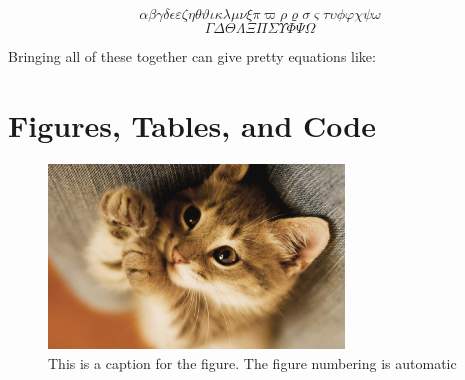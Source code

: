 \documentclass{article}
\begin{document}
\begin{equation}
    \alpha \beta \gamma \delta \epsilon \varepsilon \zeta \eta \theta \vartheta \iota \kappa \lambda \mu \nu \xi \pi \varpi \rho \varrho \sigma \varsigma \tau \upsilon \phi \varphi \chi \psi \omega
\end{equation}
\begin{equation}
    \Gamma \Delta \Theta \Lambda \Xi \Pi \Sigma \Upsilon \Phi \Psi \Omega
\end{equation}

Bringing all of these together can give pretty equations like:

\section{Figures, Tables, and Code}

\begin{figure}[h!]
    \centering
    \includegraphics[width=0.7\textwidth]{cat.jpg}
    \caption{This is a caption for the figure. The figure numbering is automatic}
\end{figure}
\end{document}
